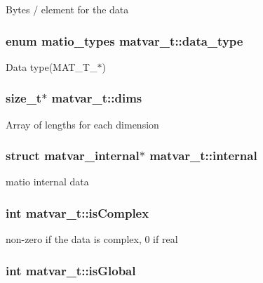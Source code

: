 Bytes / element for the data \hypertarget{structmatvar__t_ab6aafe9bd77f0f077852593dec438144}{
\subsubsection[{data\-\_\-type}]{\setlength{\rightskip}{0pt plus 5cm}enum {\bf matio\-\_\-types} matvar\-\_\-t\-::data\-\_\-type}}\label{structmatvar__t_ab6aafe9bd77f0f077852593dec438144}
Data type(\-M\-A\-T\-\_\-\-T\-\_\-$\ast$) \hypertarget{structmatvar__t_a86a0006fff01d51e04d598d8fd48e619}{
\subsubsection[{dims}]{\setlength{\rightskip}{0pt plus 5cm}size\-\_\-t$\ast$ matvar\-\_\-t\-::dims}}\label{structmatvar__t_a86a0006fff01d51e04d598d8fd48e619}
Array of lengths for each dimension \hypertarget{structmatvar__t_aa69173e24ef1ac2853548d763f97006c}{
\subsubsection[{internal}]{\setlength{\rightskip}{0pt plus 5cm}struct {\bf matvar\-\_\-internal}$\ast$ matvar\-\_\-t\-::internal}}\label{structmatvar__t_aa69173e24ef1ac2853548d763f97006c}
matio internal data \hypertarget{structmatvar__t_aeb03b3a69f108dc05470b00443a43739}{
\subsubsection[{is\-Complex}]{\setlength{\rightskip}{0pt plus 5cm}int matvar\-\_\-t\-::is\-Complex}}\label{structmatvar__t_aeb03b3a69f108dc05470b00443a43739}
non-\/zero if the data is complex, 0 if real \hypertarget{structmatvar__t_af26c71c4c0ddb14931d15910dddac1bc}{
\subsubsection[{is\-Global}]{\setlength{\rightskip}{0pt plus 5cm}int matvar\-\_\-t\-::is\-Global}}\label{structmatvar__t_af26c71c4c0ddb14931d15910dddac1bc}

